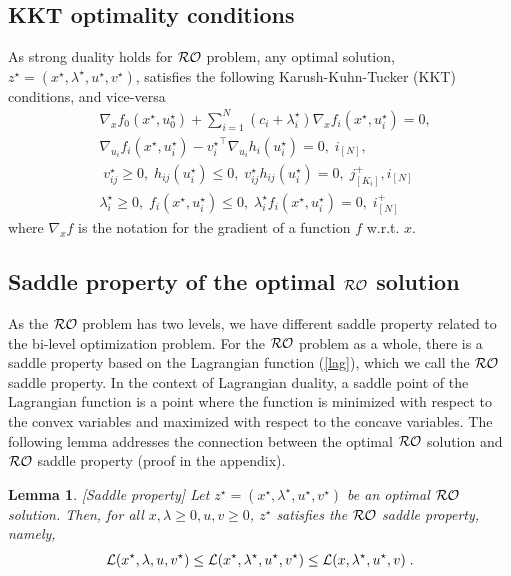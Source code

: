 \documentclass[journal,twoside,web]{ieeecolor}
\newtheorem{lemma}{Lemma}
\begin{document}
\subsection{KKT optimality conditions}
As strong duality holds for ${\cal RO}$ problem, any optimal solution, $z^\star=(x^\star,\lambda^\star,u^\star,v^\star)$, satisfies the following Karush-Kuhn-Tucker (KKT) conditions, and vice-versa \cite{boyd2004}
\begin{align}
&\nabla_x f_0(x^\star,u_0^\star)+  \sum_{i=1}^N(c_i+\lambda^\star_i) \nabla_x f_i(x^\star,u_i^\star)=0,\label{kkt1}\\
&\nabla_{u_i} f_i(x^\star,u_i^\star)-{v_i^\star}^\top \nabla_{u_i} h_i(u_i^\star)=0,\; i_ {[N]},\label{kkt2}\\
&\;v_{ij}^\star\geq 0,\; h_{ij}(u_i^\star)\leq 0,\;v_{ij}^\star h_{ij}(u_i^\star)=0,\;  j^+_{[K_i]}, i_{[N]} \label{kkt3}\\
&\lambda_i^\star\geq 0,\;f_{i}(x^\star,u_i^\star)\leq 0,\;\lambda_i^\star f_{i}(x^\star,u_i^\star)=0,\;i^+_{[N]} \label{kkt4}
\end{align}
where $\nabla_x f$ is the notation for the gradient of a function $f$ w.r.t. $x$.

\subsection{Saddle property of the optimal ${\cal RO}$ solution}
As the ${\cal RO}$ problem has two levels, we have different saddle property related to the bi-level optimization problem. For the ${\cal RO}$ problem as a whole, there is a saddle property based on the Lagrangian function (\ref{lag}), which we call the ${\cal RO}$ saddle property. In the context of Lagrangian duality, a saddle point of the Lagrangian function is a point where the function is minimized with respect to the convex variables and maximized with respect to the concave variables. The following lemma addresses the connection between the optimal ${\cal RO}$ solution and ${\cal RO}$ saddle property (proof in the appendix).

\begin{lemma} \label{saddle.lem} [Saddle property] 
Let $z^\star=(x^\star,\lambda^\star,u^\star,v^\star)$ be an optimal ${\cal RO}$ solution. Then, for all $x,\lambda\geq 0,u,v\geq 0$\;, $z^\star$ satisfies the ${\cal RO}$ saddle property, namely,
\begin{align} \label{saddle}
{\cal L}(x^\star,\lambda,u,v^\star)\leq {\cal L}(x^\star,\lambda^\star,u^\star,v^\star)\leq {\cal L}(x,\lambda^\star,u^\star,v)\;.
\end{align}
\end{lemma}
\end{document}
